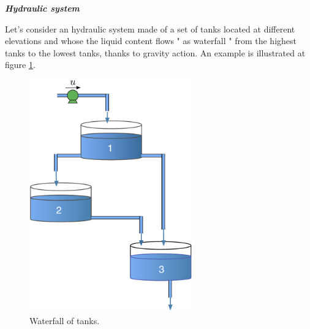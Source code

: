 \begin{exemple}\label{systhyd}{\bf \em Hydraulic system}

Let's consider an hydraulic system made of a set of 
tanks located at different elevations and whose the liquid content  
flows " as waterfall " from the highest tanks to the lowest tanks, 
thanks to gravity action. An example is illustrated at figure \ref{Fig:cascade}.

\begin{figure}[h] 
\begin{center}
\includegraphics[width=7cm]{images/cascade}
\caption{Waterfall of tanks.}
\label{Fig:cascade}
\end{center} 
\end{figure}


\end{exemple}
